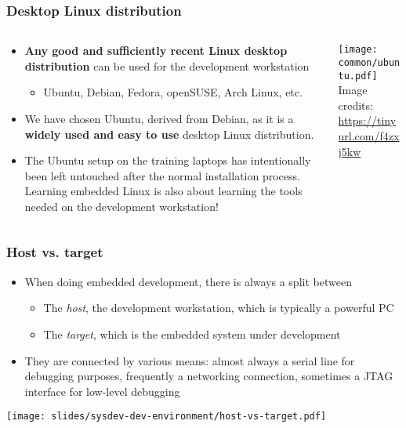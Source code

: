 \begin{frame}
  \frametitle{Desktop Linux distribution}
  \begin{columns}
    \begin{column}{0.7\textwidth}
    \begin{itemize}
    \item {\bf Any good and sufficiently recent Linux desktop
        distribution} can be used for the development workstation
      \begin{itemize}
      \item Ubuntu, Debian, Fedora, openSUSE, Arch Linux, etc.
      \end{itemize}
    \item We have chosen Ubuntu, derived from Debian, as it is a
      {\bf widely used and easy to use} desktop Linux distribution.
    \item The Ubuntu setup on the training laptops has intentionally
      been left untouched after the normal installation
      process. Learning embedded Linux is also about learning the tools
      needed on the development workstation!
    \end{itemize}
    \end{column}
    \begin{column}[t]{0.3\textwidth}
      \texttt{[image: common/ubuntu.pdf]}\\
      \tiny Image credits: \url{https://tinyurl.com/f4zxj5kw}
    \end{column}
  \end{columns}
\end{frame}

\begin{frame}
  \frametitle{Host vs. target}
  \begin{itemize}
  \item When doing embedded development, there is always a split between
    \begin{itemize}
    \item The {\em host}, the development workstation, which is
      typically a powerful PC
    \item The {\em target}, which is the embedded system under
      development
    \end{itemize}
  \item They are connected by various means: almost always a serial
    line for debugging purposes, frequently a networking connection,
    sometimes a JTAG interface for low-level debugging
  \end{itemize}
  \begin{center}
    \texttt{[image: slides/sysdev-dev-environment/host-vs-target.pdf]}
  \end{center}
\end{frame}

